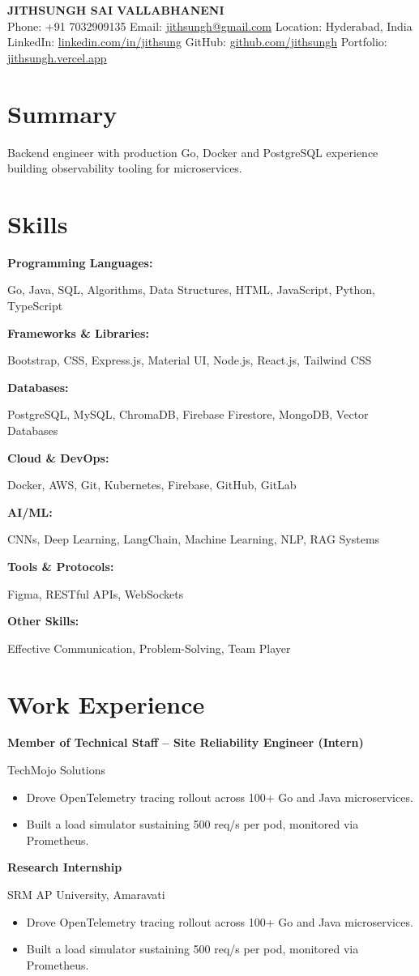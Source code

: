 \documentclass[a4paper,10pt]{article}
\newcommand{\tworow}[2]{%
  \noindent%
  \begin{minipage}[t]{0.615\textwidth}\raggedright #1\end{minipage}%
  \hfill%
  \begin{minipage}[t]{0.365\textwidth}\raggedleft #2\end{minipage}%
  \par%
}
\newcommand{\resumeheader}[3]{%
  \begin{center}
    {\LARGE \textbf{#1}} \\[0.5em]
    \small #2 \\[0.3em]
    \small #3
  \end{center}
}
\newcommand{\expentry}[3]{%
  \tworow{\textbf{#1}}{#2}%
  \ifx\relax#3\relax\else\textit{\small #3}\par\fi
}
\newenvironment{rbullets}{%
  \vspace{0.12em}%
  \begin{itemize}[leftmargin=1.1em, labelsep=0.4em, label=\textbullet,
                  itemsep=0.12em, topsep=0.08em, parsep=0pt, partopsep=0pt]%
}{%
  \end{itemize}%
}
\newcommand{\entrygap}{\vspace{0.55em}}
\newcommand{\skillrow}[2]{%
  \noindent%
  \begin{minipage}[t]{0.27\textwidth}\raggedright\textbf{#1}\end{minipage}%
  \begin{minipage}[t]{0.73\textwidth}\raggedright #2\end{minipage}%
  \par\vspace{0.18em}%
}
\begin{document}
\resumeheader{JITHSUNGH SAI VALLABHANENI}{%
  Phone: +91 7032909135 \quad  Email: \href{mailto:jithsungh@gmail.com}{jithsungh@gmail.com} \quad  Location: Hyderabad, India }{%
  LinkedIn: \href{https://linkedin.com/in/jithsung}{linkedin.com/in/jithsung} \quad  GitHub: \href{https://github.com/jithsungh}{github.com/jithsungh} \quad  Portfolio: \href{https://jithsungh.vercel.app}{jithsungh.vercel.app} }

\section*{Summary}
Backend engineer with production Go, Docker and PostgreSQL experience building observability tooling for microservices.

\section*{Skills}
\skillrow{Programming Languages:}{Go, Java, SQL, Algorithms, Data Structures, HTML, JavaScript, Python, TypeScript}
\skillrow{Frameworks \& Libraries:}{Bootstrap, CSS, Express.js, Material UI, Node.js, React.js, Tailwind CSS}
\skillrow{Databases:}{PostgreSQL, MySQL, ChromaDB, Firebase Firestore, MongoDB, Vector Databases}
\skillrow{Cloud \& DevOps:}{Docker, AWS, Git, Kubernetes, Firebase, GitHub, GitLab}
\skillrow{AI/ML:}{CNNs, Deep Learning, LangChain, Machine Learning, NLP, RAG Systems}
\skillrow{Tools \& Protocols:}{Figma, RESTful APIs, WebSockets}
\skillrow{Other Skills:}{Effective Communication, Problem-Solving, Team Player}

\section*{Work Experience}
\expentry{Member of Technical Staff -- Site Reliability Engineer (Intern)}{TechMojo Solutions}{}
\begin{rbullets}
  \item Drove OpenTelemetry tracing rollout across 100+ Go and Java microservices.
  \item Built a load simulator sustaining 500 req/s per pod, monitored via Prometheus.
\end{rbullets}
\entrygap
\expentry{Research Internship}{SRM AP University, Amaravati}{}
\begin{rbullets}
  \item Drove OpenTelemetry tracing rollout across 100+ Go and Java microservices.
  \item Built a load simulator sustaining 500 req/s per pod, monitored via Prometheus.
\end{rbullets}
\end{document}
